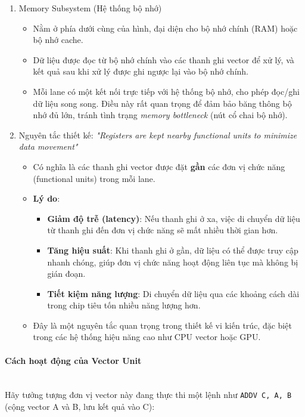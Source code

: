 \documentclass[a4paper]{article}
\begin{document}
\begin{enumerate}
    \item Memory Subsystem (Hệ thống bộ nhớ)
    \begin{itemize}
        \item Nằm ở phía dưới cùng của hình, đại diện cho bộ nhớ chính (RAM) hoặc bộ nhớ cache.
        \item Dữ liệu được đọc từ bộ nhớ chính vào các thanh ghi vector để xử lý, và kết quả sau khi xử lý được ghi ngược lại vào bộ nhớ chính.
        \item Mỗi lane có một kết nối trực tiếp với hệ thống bộ nhớ, cho phép đọc/ghi dữ liệu song song. Điều này rất quan trọng để đảm bảo băng thông bộ nhớ đủ lớn, tránh tình trạng \textit{memory bottleneck} (nút cổ chai bộ nhớ).
    \end{itemize}
    
    \item Nguyên tắc thiết kế: \textit{"Registers are kept nearby functional units to minimize data movement"}
    \begin{itemize}
        \item Có nghĩa là các thanh ghi vector được đặt \textbf{gần} các đơn vị chức năng (functional units) trong mỗi lane.
        \item \textbf{Lý do}:
        \begin{itemize}
            \item \textbf{Giảm độ trễ (latency)}: Nếu thanh ghi ở xa, việc di chuyển dữ liệu từ thanh ghi đến đơn vị chức năng sẽ mất nhiều thời gian hơn.
            \item \textbf{Tăng hiệu suất}: Khi thanh ghi ở gần, dữ liệu có thể được truy cập nhanh chóng, giúp đơn vị chức năng hoạt động liên tục mà không bị gián đoạn.
            \item \textbf{Tiết kiệm năng lượng}: Di chuyển dữ liệu qua các khoảng cách dài trong chip tiêu tốn nhiều năng lượng hơn.
        \end{itemize}
        \item Đây là một nguyên tắc quan trọng trong thiết kế vi kiến trúc, đặc biệt trong các hệ thống hiệu năng cao như CPU vector hoặc GPU.
    \end{itemize}
\end{enumerate}

\paragraph{Cách hoạt động của Vector Unit}\leavevmode\\
Hãy tưởng tượng đơn vị vector này đang thực thi một lệnh như \texttt{ADDV C, A, B} (cộng vector A và B, lưu kết quả vào C):
\end{document}
